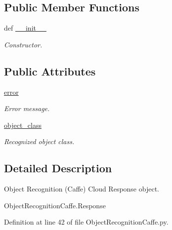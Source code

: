 \subsection*{Public Member Functions}
\begin{DoxyCompactItemize}
\item 
def \hyperlink{classRappCloud_1_1CloudMsgs_1_1ObjectRecognitionCaffe_1_1ObjectRecognitionCaffe_1_1Response_a5e74d55acfa01c540efac1b5c38991fd}{\-\_\-\-\_\-init\-\_\-\-\_\-}
\begin{DoxyCompactList}\small\item\em Constructor. \end{DoxyCompactList}\end{DoxyCompactItemize}
\subsection*{Public Attributes}
\begin{DoxyCompactItemize}
\item 
\hyperlink{classRappCloud_1_1CloudMsgs_1_1ObjectRecognitionCaffe_1_1ObjectRecognitionCaffe_1_1Response_ac787dd0dfb277934cb996a03704970af}{error}
\begin{DoxyCompactList}\small\item\em Error message. \end{DoxyCompactList}\item 
\hyperlink{classRappCloud_1_1CloudMsgs_1_1ObjectRecognitionCaffe_1_1ObjectRecognitionCaffe_1_1Response_aa4cdc83276f00d365d3df48101dfbb20}{object\-\_\-class}
\begin{DoxyCompactList}\small\item\em Recognized object class. \end{DoxyCompactList}\end{DoxyCompactItemize}


\subsection{Detailed Description}
\begin{DoxyVerb}Object Recognition (Caffe) Cloud Response object.

ObjectRecognitionCaffe.Response
\end{DoxyVerb}
 

Definition at line 42 of file Object\-Recognition\-Caffe.\-py.



